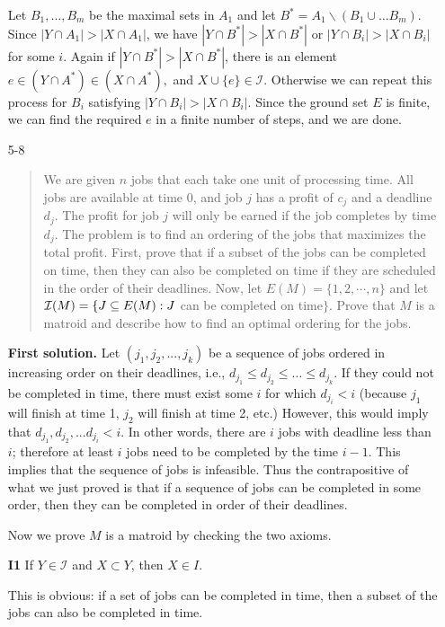 \documentclass[12pt]{article}
\newcommand{\I}{\mathcal I}
\begin{document}
\begin{enumerate}
Let $B_1,\ldots,B_m$ be the maximal sets in $A_1$ and let
$B^{*}=A_1\backslash(B_1\cup \ldots B_m)$. Since $|Y\cap
A_1|>|X\cap A_1|$, we have $|Y\cap B^{*}|>|X\cap B^{*}|$ or $|Y\cap
B_i|>|X\cap B_i|$ for some $i$. Again if $|Y\cap B^{*}|>|X\cap
B^{*}|$, there is an element $e \in (Y\cap A^{*})\in (X\cap A^{*}),$
and $X \cup \{e\}\in \mathcal{I}.$ Otherwise we can repeat this process
for $B_i$ satisfying $|Y\cap B_i|>|X\cap B_i|$. Since the ground set
$E$ is finite, we can find the required $e$ in a finite number of
steps, and we are done.


\item[5-8]

\begin{quote}
We are given $n$ jobs that each take one unit of
processing time. All jobs are available at time 0, and job $j$ has a
profit of $c_j$ and a deadline $d_j$. The profit for job $j$ will only
be earned if the job completes by time $d_j$. The problem is to find
an ordering of the jobs that maximizes the total profit. First, prove
that if a subset of the jobs can be completed on time, then they can
also be completed on time if they are scheduled in the order of their
deadlines. Now, let $E(M)=\{1,2,\cdots,n\}$ and let ${\cal
I}(M)=\{J\subseteq E(M): J$ can be completed on time$\}$. Prove that
$M$ is a matroid and describe how to find an optimal ordering for the
jobs.
\end{quote}

{\bf First solution.}
Let $(j_1, j_2, ..., j_k)$ be a sequence of jobs ordered in increasing order on their deadlines, i.e., $d_{j_1}\leq d_{j_2}\leq \ldots\leq d_{j_k}$. If they could not be completed in time, there must exist some $i$ for which $d_{j_i} < i$ (because $j_1$ will finish at time 1, $j_2$ will finish at time 2, etc.) However, this would imply that $d_{j_1}, d_{j_2}, ... d_{j_i} < i$.
	In other words, there are $i$ jobs with deadline less than $i$; therefore at least $i$ jobs need to be completed by the time $i-1$. This implies that the sequence of jobs is infeasible. Thus the contrapositive of what we just proved is that if a sequence of jobs can be completed in some order, then they can be completed in order of their deadlines.

Now we prove $M$ is a matroid by checking the two axioms.
		
{\bf I1} If $Y \in \I$ and $X \subset Y$, then $X \in I$.
	
This is obvious: if a set of jobs can be completed in time, then a subset of the jobs can also be completed in time.
	

\end{enumerate}
\end{document}
